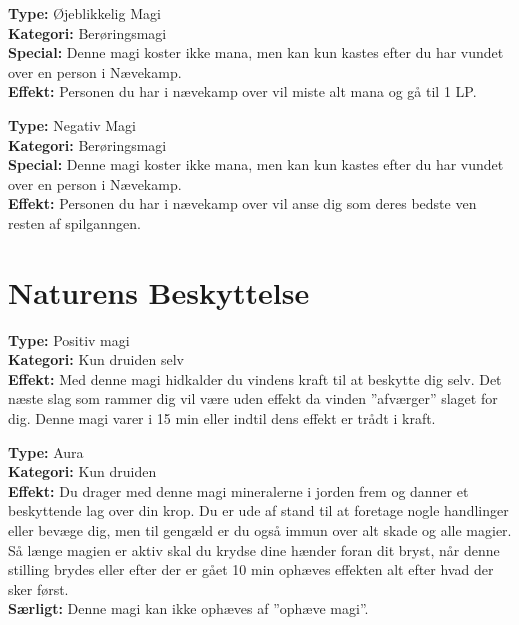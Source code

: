 \begin{nbesk*}
\textbf{Type:} Øjeblikkelig Magi\\ 
\textbf{Kategori:} Berøringsmagi\\
\textbf{Special:} Denne magi koster ikke mana, men kan kun kastes efter du har vundet over en person i Nævekamp.\\
\textbf{Effekt:} Personen du har i nævekamp over vil miste alt mana og gå til 1 LP.
\end{nbesk*}

\begin{nbesk*}
\textbf{Type:} Negativ Magi\\ 
\textbf{Kategori:} Berøringsmagi\\
\textbf{Special:} Denne magi koster ikke mana, men kan kun kastes efter du har vundet over en person i Nævekamp.\\
\textbf{Effekt:} Personen du har i nævekamp over vil anse dig som deres bedste ven resten af spilganngen.
\end{nbesk*}

\newpage
\section{Naturens Beskyttelse}

\begin{nBeskyt*}
\textbf{Type:} Positiv magi\\ 
\textbf{Kategori:} Kun druiden selv\\
\textbf{Effekt:} Med denne magi hidkalder du vindens kraft til at beskytte dig selv. Det næste slag som rammer dig vil være uden effekt da vinden ”afværger” slaget for dig. Denne magi varer i 15 min eller indtil dens effekt er trådt i kraft.
\end{nBeskyt*}

\begin{nBeskyt*}[Stenform]
\textbf{Type:} Aura \\
\textbf{Kategori:} Kun druiden \\
\textbf{Effekt:} Du drager med denne magi mineralerne i jorden frem og danner et beskyttende lag over din krop. Du er ude af stand til at foretage nogle handlinger eller bevæge dig, men til gengæld er du også immun over alt skade og alle magier.\\
Så længe magien er aktiv skal du krydse dine hænder foran dit bryst, når denne stilling brydes eller efter der er gået 10 min ophæves effekten alt efter hvad der sker først.\\
\textbf{Særligt:} Denne magi kan ikke ophæves af ”ophæve magi”.
\end{nBeskyt*}

